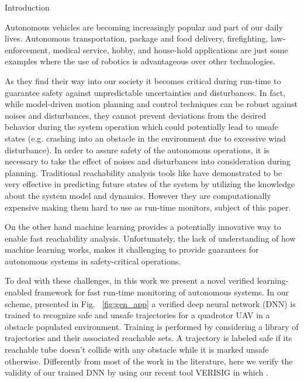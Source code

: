 
\begin{section}{Introduction} \label{sec:intro}

Autonomous vehicles are becoming increasingly popular and part of our daily lives. Autonomous transportation, package and food delivery, firefighting, law-enforcement, medical service, hobby, and house-hold applications are just some examples where the use of robotics is advantageous over other technologies. 

As they find their way into our society it becomes critical during run-time to guarantee safety against unpredictable uncertainties and disturbances. In fact, while model-driven motion planning and control techniques can be robust against noises and disturbances, they cannot prevent deviations from the desired behavior during the system operation which could potentially lead to unsafe states (e.g. crashing into an obstacle in the environment due to excessive wind disturbance). In order to assure safety of the autonomous operations, it is necessary to take the effect of noises and disturbances into consideration during planning. Traditional reachability analysis tools like  have demonstrated to be very effective in predicting future states of the system by utilizing the knowledge about the system model and dynamics. However they are computationally expensive making them hard to use as run-time monitors, subject of this paper.

On the other hand machine learning provides a potentially innovative way to enable fast reachability analysis. Unfortunately, the lack of understanding of how machine learning works, makes it challenging to provide guarantees for autonomous systems in safety-critical operations.

To deal with these challenges, in this work we present a novel verified learning-enabled framework for fast run-time monitoring of autonomous systems. In our scheme, presented in Fig. ~\ref{fig:gen_app}  a verified deep neural network (DNN) is trained to recognize safe and unsafe trajectories for a quadrotor UAV in a obstacle populated environment. Training is performed by considering a library of trajectories and their associated reachable sets. A trajectory is labeled safe if its reachable tube doesn't collide with any obstacle while it is marked unsafe otherwise. Differently from most of the work in the literature, here we verify the validity of our trained DNN by using our recent tool VERISIG \cite{IvanovVerisig18} in which . 


\end{section}
